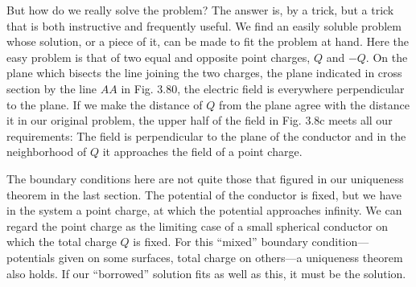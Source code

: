But how do we really solve the problem? The answer is, by a trick,
but a trick that is both instructive and frequently useful. We find an
easily soluble problem whose solution, or a piece of it, can be made
to fit the problem at hand. Here the easy problem is that of two equal
and opposite point charges, $Q$ and $- Q$. On the plane which bisects
the line joining the two charges, the plane indicated in cross section
by the line $AA$ in Fig. 3.80, the electric field is everywhere perpendicular
to the plane. If we make the distance of $Q$ from the plane
agree with the distance it in our original problem, the upper half of
the field in Fig. 3.8c meets all our requirements: The field is perpendicular
to the plane of the conductor and in the neighborhood of $Q$
it approaches the field of a point charge.

The boundary conditions here are not quite those that figured in
our uniqueness theorem in the last section. The potential of the conductor
is fixed, but we have in the system a point charge, at which
the potential approaches infinity. We can regard the point charge
as the limiting case of a small spherical conductor on which the total
charge $Q$ is fixed. For this ``mixed'' boundary condition---potentials
given on some surfaces, total charge on others---a uniqueness
theorem also holds. If our ``borrowed'' solution fits as well as this,
it must be the solution.

